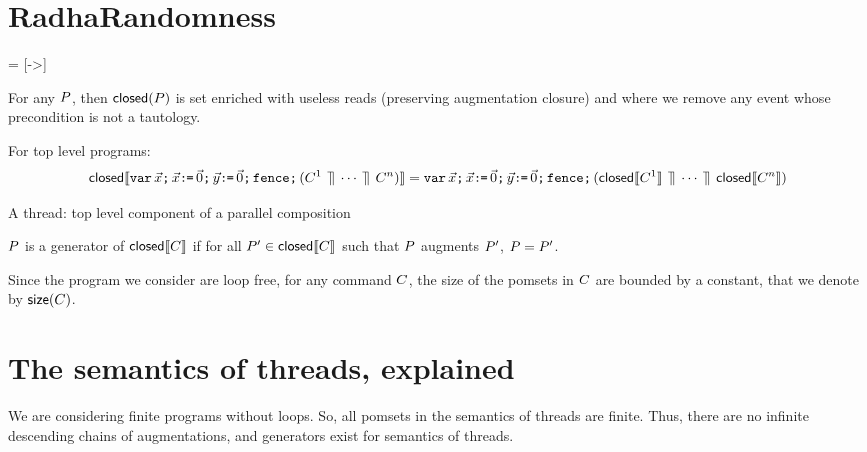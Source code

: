 \section{RadhaRandomness}

\newcommand{\acylic}{\mathit{acyclic}}

 = [->]
\newcommand{\feco}{\mathit{eco}}
\newcommand{\reco}{\ensuremath{\mathrel{\mathsf{eco}}}}%
\newcommand{\xeco}{\xarrowtikz{eco}{eco}}

\newcommand{\reads}{\mathit{Reads}}
\newcommand{\Seq}{{\tt Sequential}}

\newcommand{\writes}{\mathit{Writes}}
\newcommand{\pomf}[1]{Fun_{#1}}
\newcommand{\pomFn}{\mathit{PomFn}}
\newcommand{\power}{\mathcal{P}}
\newcommand{\aFn}{F}
\newcommand{\aRSet}{R}
\newcommand{\bRSet}{S}
\newcommand{\aWSet}{U}
\newcommand{\bWSet}{V}
\newcommand{\aWrite}{\aAct_w}
\newcommand{\bPS}{\aPS'}
\newcommand{\cPS}{\aPS_1}
\newcommand{\dPS}{\aPS'_1}
\newcommand{\after}{\mathrel{\mathsf{after}}}
\newcommand{\size}{\mathsf{size}}


For any $P$, then $\textsf{closed}(P)$ is set enriched with useless reads
(preserving augmentation closure) and where we remove any event whose
precondition is not a tautology.

For top level programs:
\begin{displaymath}
  \textsf{closed}\llbracket\texttt{var}\,\vec{x}\texttt{;}\,
    \vec{x}\texttt{:}\mkern-1mu\texttt{=}\,\vec{0}\texttt{;}\,
    \vec{y}\texttt{:}\mkern-1mu\texttt{=}\,\vec{0}\texttt{;}\,
    \texttt{fence}\texttt{;}\,
    (C^1 \,\mathbin{\rrceil}\, \cdots \,\mathbin{\rrceil}\, C^n)\rrbracket
  =
  \texttt{var}\,\vec{x}\texttt{;}\,
    \vec{x}\texttt{:}\mkern-1mu\texttt{=}\,\vec{0}\texttt{;}\,
    \vec{y}\texttt{:}\mkern-1mu\texttt{=}\,\vec{0}\texttt{;}\,
    \texttt{fence}\texttt{;}\,
    (\textsf{closed}\llbracket C^1\rrbracket \,\mathbin{\rrceil}\, \cdots \,\mathbin{\rrceil}\, \textsf{closed}\llbracket C^n\rrbracket)
\end{displaymath}

\begin{definition}
A thread: top level component of a parallel composition
\end{definition}

\begin{definition}
$P$ is a generator of  $\textsf{closed}\llbracket C\rrbracket$ if for all $\bPS \in \semClosed{\aCmd}$ such that $P$ augments $\bPS$, $\aPS = \bPS$.
\end{definition}



Since the program we consider are loop free, for any command $C$, the size of the pomsets in $C$ are bounded by a constant, that we denote by $\size(\aCmd)$.  
 

\section{The semantics  of threads, explained}
We are considering finite programs without loops.  So,  all pomsets in the semantics of threads are finite.  Thus, there are no infinite descending chains of augmentations, and  generators exist for semantics of threads.



